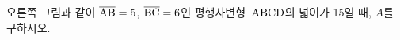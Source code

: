 \noindent\begin{minipage}[t]{0.58\linewidth}\vspace{0pt}\raggedright 오른쪽 그림과 같이 $\overline{\mathrm{AB}}=5$, $\overline{\mathrm{BC}}=6$인 평행사변형~$\mathrm{ABCD}$의 넓이가 15일 때, $A$를 구하시오. \end{minipage}\hfill\begin{minipage}[t]{0.4\linewidth}\vspace{0pt}\centering \resizebox{\ifdim\width>\linewidth\linewidth\else\width\fi}{!}{}\end{minipage}\par
